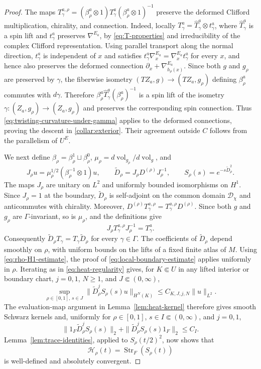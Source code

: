\documentclass[12pt,reqno]{amsart}
\numberwithin{equation}{section}
\theoremstyle{definition}
\newcommand{\Str}{\operatorname{Str}}
\begin{document}
\begin{proof}
The maps $T_\gamma^{a,\rho}=(\beta_\rho^a\otimes1)
T_\gamma^a(\beta_\rho^a\otimes1)^{-1}$ preserve the deformed
Clifford multiplication, chirality, and connection.  Indeed, locally
$T_\gamma^a=\widehat T_\gamma^a\otimes t_\gamma^a$, where
$\widehat T_\gamma^a$ is a spin lift and $t_\gamma^a$ preserves
$\nabla^{E_a}$, by \eqref{eq:T-properties} and irreducibility of the
complex Clifford representation.  Using parallel transport along the normal direction, $t_\gamma^a$
is independent of $x$ and satisfies $t_\gamma^a\nabla_x^{E_a} =\nabla_x^{E_a}t_\gamma^a$
for every $x$, and hence also preserves the deformed connection
$\partial_x+\nabla_{h_\rho(x)}^{E_a}$.  Since both $g$ and $g_\rho$
are preserved by $\gamma$, the fiberwise isometry
$(TZ_a,g)\to(TZ_a,g_\rho)$ defining $\beta_\rho^a$ commutes with
$d\gamma$.  Therefore $\beta_\rho^a\widehat T_\gamma^a(\beta_\rho^a)^{-1}$
is a spin lift of the isometry
$\gamma:(Z_a,g_\rho)\to(Z_a,g_\rho)$ and preserves the corresponding
spin connection.
Thus \eqref{eq:twisting-curvature-under-gamma} applies to the deformed
connections, proving the descent in \ref{collar:exterior}. Their
agreement outside $C$ follows from the parallelism of $U^E$.


We next define $\beta_\rho=\beta_\rho^1\sqcup\beta_\rho^0$,
$\mu_\rho=d\operatorname{vol}_{g_\rho}/d\operatorname{vol}_g$, and
\[
 J_\rho u=\mu_\rho^{1/2}(\beta_\rho^{-1}\otimes1)u,\qquad
 \widetilde D_\rho=J_\rho D^{(\rho)}J_\rho^{-1},\qquad
 S_\rho(s)=e^{-s\widetilde D_\rho^2}.
\]
The maps $J_\rho$ are unitary on $L^2$ and uniformly bounded
isomorphisms on $H^1$.  Since $J_\rho=1$ at the boundary,
$\widetilde D_\rho$ is self-adjoint on the common domain
$\mathcal D_\chi$ and anticommutes with chirality.  Moreover,
$D^{(\rho)}T_\gamma^{a,\rho}
=T_\gamma^{a,\rho}D^{(\rho)}$.  Since both $g$ and $g_\rho$ are
$\Gamma$-invariant, so is $\mu_\rho$, and the definitions give
\[
 J_\rho T_\gamma^{a,\rho}J_\rho^{-1}=T_\gamma^a.
\]
Consequently $\widetilde D_\rho T_\gamma=T_\gamma\widetilde D_\rho$ for every $\gamma\in\Gamma$.
The coefficients of $\widetilde D_\rho$ depend smoothly on $\rho$,
with uniform bounds on the lifts of a fixed finite atlas of $M$.
Using \eqref{eq:rho-H1-estimate}, the proof of
\eqref{eq:local-boundary-estimate} applies uniformly in $\rho$.
Iterating as in \eqref{eq:heat-regularity} gives, for
$K\Subset U$ in any lifted interior or boundary chart,
$j=0,1$, $N\geq1$, and $J\Subset(0,\infty)$,
\begin{equation}\label{eq:rho-heat-regularity}
 \sup_{\rho\in[0,1],\,s\in J}
 \|\widetilde D_\rho^jS_\rho(s)u\|_{H^N(K)}
 \leq C_{K,J,j,N}\|u\|_{L^2}.
\end{equation}
The evaluation-map argument in Lemma~\ref{lem:heat-kernel} therefore
gives smooth Schwarz kernels and, uniformly for
$\rho\in[0,1]$, $s\in I\Subset(0,\infty)$, and $j=0,1$,
\[
 \|1_F\widetilde D_\rho^jS_\rho(s)\|_2
 +\|\widetilde D_\rho^jS_\rho(s)1_F\|_2
 \leq C_I.
\]
Lemma~\ref{lem:trace-identities}, applied to
$S_\rho(t/2)^2$, now shows that
\[
 \mathscr H_\rho(t)=\Str_F(S_\rho(t))
\]
is well-defined and absolutely convergent.


\end{proof}
\end{document}
